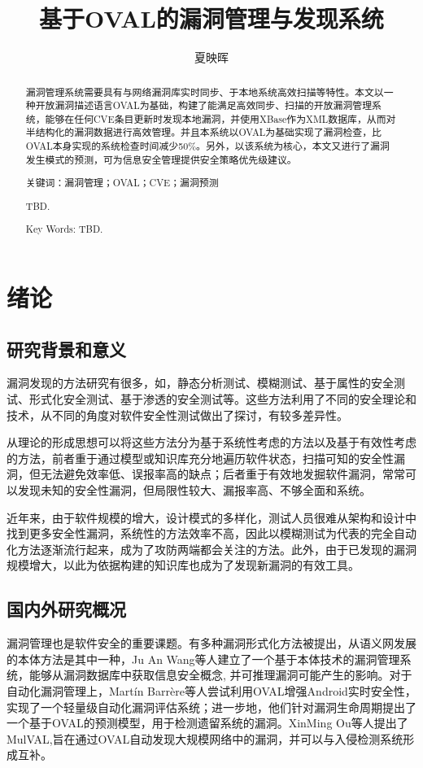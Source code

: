 \documentclass[a4paper]{ctexrep}
\title{基于OVAL的漏洞管理与发现系统}
\author{夏映晖}
\date{}
\begin{document}
	\maketitle
	\begin{abstract}
	漏洞管理系统需要具有与网络漏洞库实时同步、于本地系统高效扫描等特性。本文以一种开放漏洞描述语言OVAL为基础，构建了能满足高效同步、扫描的开放漏洞管理系统，能够在任何CVE条目更新时发现本地漏洞，并使用XBase作为XML数据库，从而对半结构化的漏洞数据进行高效管理。并且本系统以OVAL为基础实现了漏洞检查，比OVAL本身实现的系统检查时间减少50\%。另外，以该系统为核心，本文又进行了漏洞发生模式的预测，可为信息安全管理提供安全策略优先级建议。
	
	关键词：漏洞管理；OVAL；CVE；漏洞预测
	\end{abstract}
	\renewcommand\abstractname{abstract}
	\begin{abstract}
	TBD.
	
	Key Words: TBD.
	\end{abstract}
	\tableofcontents
	\newpage
	\setcounter{page}{1}
	\chapter{绪论}
		\section{研究背景和意义}
		漏洞发现的方法研究有很多，如，静态分析测试、模糊测试、基于属性的安全测试、形式化安全测试、基于渗透的安全测试等。这些方法利用了不同的安全理论和技术，从不同的角度对软件安全性测试做出了探讨，有较多差异性。
		
		从理论的形成思想可以将这些方法分为基于系统性考虑的方法以及基于有效性考虑的方法，前者重于通过模型或知识库充分地遍历软件状态，扫描可知的安全性漏洞，但无法避免效率低、误报率高的缺点；后者重于有效地发掘软件漏洞，常常可以发现未知的安全性漏洞，但局限性较大、漏报率高、不够全面和系统。

		近年来，由于软件规模的增大，设计模式的多样化，测试人员很难从架构和设计中找到更多安全性漏洞，系统性的方法效率不高，因此以模糊测试为代表的完全自动化方法逐渐流行起来，成为了攻防两端都会关注的方法。此外，由于已发现的漏洞规模增大，以此为依据构建的知识库也成为了发现新漏洞的有效工具。
		\section{国内外研究概况} 
		漏洞管理也是软件安全的重要课题。有多种漏洞形式化方法被提出，从语义网发展的本体方法是其中一种，Ju An Wang等人建立了一个基于本体技术的漏洞管理系统，能够从漏洞数据库中获取信息安全概念, 并可推理漏洞可能产生的影响。对于自动化漏洞管理上，Martín Barrère等人尝试利用OVAL增强Android实时安全性，实现了一个轻量级自动化漏洞评估系统；进一步地，他们针对漏洞生命周期提出了一个基于OVAL的预测模型，用于检测遗留系统的漏洞。XinMing Ou等人提出了MulVAL,旨在通过OVAL自动发现大规模网络中的漏洞，并可以与入侵检测系统形成互补。
\end{document}
